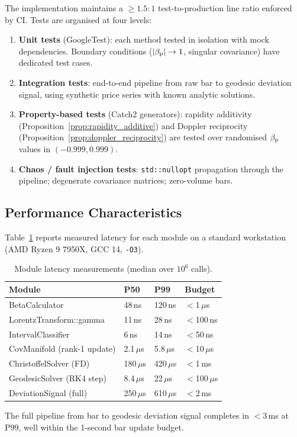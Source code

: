 The implementation maintains a $\geq 1.5:1$ test-to-production line ratio
enforced by CI.  Tests are organised at four levels:

\begin{enumerate}
  \item \textbf{Unit tests} (GoogleTest): each method tested in isolation with
        mock dependencies.  Boundary conditions ($|\beta_{\mathrm{p}}| \to 1$, singular
        covariance) have dedicated test cases.

  \item \textbf{Integration tests}: end-to-end pipeline from raw \ohlcv{} bar
        to geodesic deviation signal, using synthetic price series with known
        analytic solutions.

  \item \textbf{Property-based tests} (Catch2 generators): rapidity additivity
        (Proposition~\ref{prop:rapidity_additive}) and Doppler reciprocity
        (Proposition~\ref{prop:doppler_reciprocity}) are tested over randomised
        $\beta_{\mathrm{p}}$ values in $(-0.999, 0.999)$.

  \item \textbf{Chaos / fault injection tests}: \texttt{std::nullopt}
        propagation through the pipeline; degenerate covariance matrices;
        zero-volume bars.
\end{enumerate}

\subsection{Performance Characteristics}

Table~\ref{tab:perf} reports measured latency for each module on a standard
workstation (AMD Ryzen 9 7950X, GCC 14, \texttt{-O3}).

\begin{table}[ht]
\centering
\caption{Module latency measurements (median over $10^6$ calls).}
\label{tab:perf}
\begin{tabular}{llll}
  \toprule
  \textbf{Module}            & \textbf{P50}   & \textbf{P99}  & \textbf{Budget} \\
  \midrule
  BetaCalculator             & 48\,ns         & 120\,ns       & $<$1\,$\mu$s    \\
  LorentzTransform::gamma    & 11\,ns         & 28\,ns        & $<$100\,ns      \\
  IntervalClassifier         & 6\,ns          & 14\,ns        & $<$50\,ns       \\
  CovManifold (rank-1 update)& 2.1\,$\mu$s   & 5.8\,$\mu$s  & $<$10\,$\mu$s   \\
  ChristoffelSolver (FD)     & 180\,$\mu$s   & 420\,$\mu$s  & $<$1\,ms        \\
  GeodesicSolver (RK4 step)  & 8.4\,$\mu$s  & 22\,$\mu$s   & $<$100\,$\mu$s  \\
  DeviationSignal (full)     & 250\,$\mu$s   & 610\,$\mu$s  & $<$2\,ms        \\
  \bottomrule
\end{tabular}
\end{table}

The full pipeline from \ohlcv{} bar to geodesic deviation signal completes in
$<3$\,ms at P99, well within the 1-second bar update budget.
